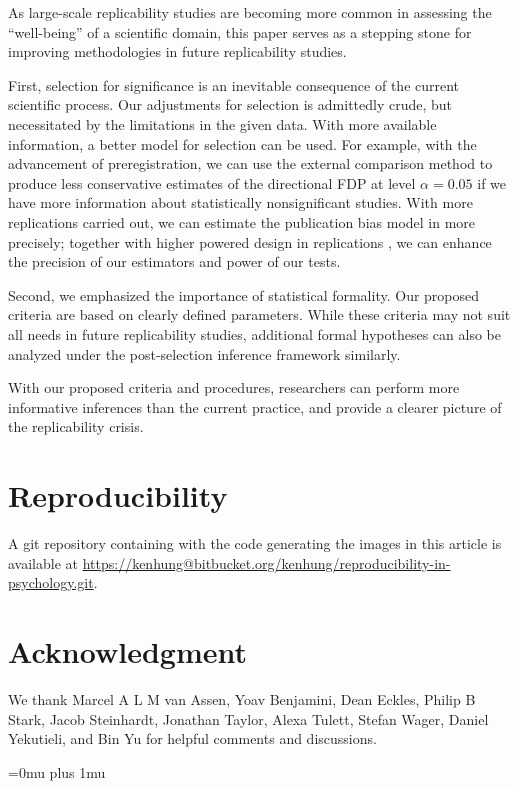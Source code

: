 \documentclass[11pt]{article}
\theoremstyle{definition}
\theoremstyle{custom}
\begin{document}
  As large-scale replicability studies are becoming more common in assessing the ``well-being'' of a scientific domain, this paper serves as a stepping stone for improving methodologies in future replicability studies.

  First, selection for significance is an inevitable consequence of the current scientific process. Our adjustments for selection is admittedly crude, but necessitated by the limitations in the given data. With more available information, a better model for selection can be used. For example, with the advancement of preregistration, we can use the external comparison method to produce less conservative estimates of the directional FDP at level $\alpha = 0.05$ if we have more information about statistically nonsignificant studies. With more replications carried out, we can estimate the publication bias model in \citet{Andrews:2018vh} more precisely; together with higher powered design in replications \citep[e.g.][]{Camerer:2018de}, we can enhance the precision of our estimators and power of our tests.

  Second, we emphasized the importance of statistical formality. Our proposed criteria are based on clearly defined parameters. While these criteria may not suit all needs in future replicability studies, additional formal hypotheses can also be analyzed under the post-selection inference framework similarly.

  With our proposed criteria and procedures, researchers can perform more informative inferences than the current practice, and provide a clearer picture of the replicability crisis.

\section*{Reproducibility}

  A git repository containing with the code generating the images in this article is available at \url{https://kenhung@bitbucket.org/kenhung/reproducibility-in-psychology.git}.

\section*{Acknowledgment}

  We thank Marcel A L M van Assen, Yoav Benjamini, Dean Eckles, Philip B Stark, Jacob Steinhardt, Jonathan Taylor, Alexa Tulett, Stefan Wager, Daniel Yekutieli, and Bin Yu for helpful comments and discussions.

\Urlmuskip=0mu plus 1mu\relax


\end{document}
